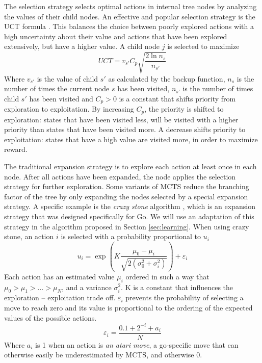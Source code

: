 The selection strategy selects optimal actions in internal tree nodes by
analyzing the values of their child nodes. An effective and popular selection
strategy is the UCT formula \cite{kocsis2006bandit}. This balances the choice
between poorly explored actions with a high uncertainty about their value and
actions that have been explored extensively, but have a higher value. A child
node $j$ is selected to maximize
\begin{equation}
	\label{eq:uct}
	UCT = v_{s'} C_p \sqrt{\frac{2 \ln n_s}{n_{s'}}}
\end{equation}
Where $v_{s'}$ is the value of child $s'$ as calculated by the backup function,
$n_s$ is the number of times the current node $s$ has been visited, $n_{s'}$ is
the number of times child $s'$ has been visited and $C_p > 0$ is a constant
that shifts priority from exploration to exploitation. By increasing $C_p$, the
priority is shifted to exploration: states that have been visited less, will be
visited with a higher priority than states that have been visited more. A
decrease shifts priority to exploitation: states that have a high value are
visited more, in order to maximize reward. 

The traditional expansion strategy is to explore each action at least once in
each node. After all actions have been expanded, the node applies the selection
strategy for further exploration. Some variants of MCTS reduce the branching
factor of the tree by only expanding the nodes selected by a special expansion
strategy. A specific example is the \emph{crazy stone} algorithm
\cite{coulom2007efficient}, which is an expansion strategy that was designed
specifically for Go. We will use an adaptation of this strategy in the algorithm
proposed in Section \ref{sec:learning}.  When using crazy stone, an action $i$
is selected with a probability proportional to $u_i$
\begin{equation}
	\label{eq:crazystone}
	u_i = \exp\left(K \frac{\mu_0 - \mu_i}{\sqrt{2\left(\sigma_0^2 +
\sigma_i^2\right)}}\right) + \varepsilon_i
\end{equation}
Each action has an estimated value $\mu_i$ ordered in such a way that $\mu_0 >
\mu_1 > \ldots > \mu_N$, and a variance $\sigma_i^2$. K is a constant
that influences the exploration -- exploitation trade off. $\varepsilon_i$ prevents
the probability of selecting a move to reach zero and its value is proportional
to the ordering of the expected values of the possible actions. 
\begin{equation}
	\label{eq:epsilon}
	\varepsilon_i = \frac{0.1 + 2^{-i} + a_i}{N}
\end{equation}
Where $a_i$ is 1 when an action is \emph{an atari move}, a go-specific
move that can otherwise easily be underestimated by MCTS, and otherwise 0.


